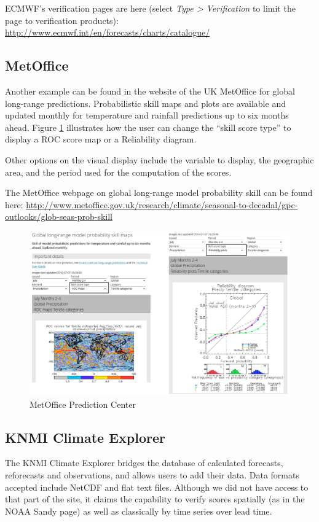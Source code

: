 \documentclass[logos,parttoc,morelanguage=french,morelanguage=german]{orsay-memoire}
\begin{document}
ECMWF's verification pages are here (select \emph{Type > Verification} to limit the page to verification products): \href{http://www.ecmwf.int/en/forecasts/charts/catalogue/}{http://www.ecmwf.int/en/forecasts/charts/catalogue/}



\subsection*{MetOffice}
Another example can be found in the website of the UK MetOffice for global long-range predictions. Probabilistic skill maps and plots are available and updated monthly for temperature and rainfall predictions up to six months ahead. Figure \ref{fig:metOffice1} illustrates how the user can change the “skill score type” to display a ROC score map or a Reliability diagram.

Other options on the visual display include the variable to display, the geographic area, and the period used for the computation of the scores.

The MetOffice webpage on global long-range model probability skill can be found here: \href{http://www.metoffice.gov.uk/research/climate/seasonal-to-decadal/gpc-outlooks/glob-seas-prob-skill}{http://www.metoffice.gov.uk/research/climate/seasonal-to-decadal/gpc-outlooks/glob-seas-prob-skill}

\begin{figure}[H]
\centering
\includegraphics[width=0.80\linewidth]{images/exempleMetOffice1.png}
  \caption{MetOffice Prediction Center}
  \label{fig:metOffice1}
\end{figure}


\subsection*{KNMI Climate Explorer}
The KNMI Climate Explorer bridges the database of calculated forecasts, reforecasts and observations, and allows users to add their data. Data formats accepted include NetCDF and flat text files. Although we did not have access to that part of the site, it claims the capability to verify scores spatially (as in the NOAA Sandy page) as well as classically by time series over lead time.
\end{document}
